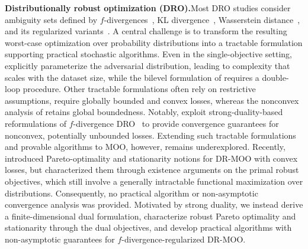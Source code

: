 \documentclass[twoside]{article} %
\theoremstyle{plain}
\theoremstyle{definition}
\theoremstyle{remark}
\begin{document}
\textbf{Distributionally robust optimization (DRO).}Most DRO studies consider ambiguity sets defined by \(f\)-divergences~\citep{DRO3rd,duchiDRO,lamfDRO,large-scaleDRO,qiaaai}, KL divergence~\citep{huKLDRO,qiKLDRO}, Wasserstein distance~\citep{blanchetwasserstein,gaoregularizeWDRO,gaoWDRO}, and its regularized variants~\citep{sinkhornDROwang,wangzihansinkhornDRO,yufengSinkhornDRO}. A central challenge is to transform the resulting worst-case optimization over probability distributions into a tractable formulation supporting practical stochastic algorithms. Even in the single-objective setting, \citet{DRO3rd,mini-maxWDRO} explicitly parameterize the adversarial distribution, leading to complexity that scales with the dataset size, while the bilevel formulation of \citet{yufengSinkhornDRO} requires a double-loop procedure. Other tractable formulations often rely on restrictive assumptions, \citet{large-scaleDRO,sinkhornDROwang} require globally bounded and convex losses, whereas the nonconvex analysis of \citet{qiaaai} retains global boundedness. Notably, \citet{jinnonconvexdro,qirevistfDRO} exploit strong-duality-based reformulations of \(f\)-divergence DRO~\citep{DROBook,duchiDRO,large-scaleDRO} to provide convergence guarantees for nonconvex, potentially unbounded losses. Extending such tractable formulations and provable algorithms to MOO, however, remains underexplored. Recently, \citet{DRMOOLatorre} introduced Pareto-optimality and stationarity notions for DR-MOO with convex losses, but characterized them through existence arguments on the primal robust objectives, which still involve a generally intractable functional maximization over distributions. Consequently, no practical algorithm or non-asymptotic convergence analysis was provided. Motivated by strong duality, we instead derive a finite-dimensional dual formulation, characterize robust Pareto optimality and stationarity through the dual objectives, and develop practical algorithms with non-asymptotic guarantees for \(f\)-divergence-regularized DR-MOO.
\end{document}

